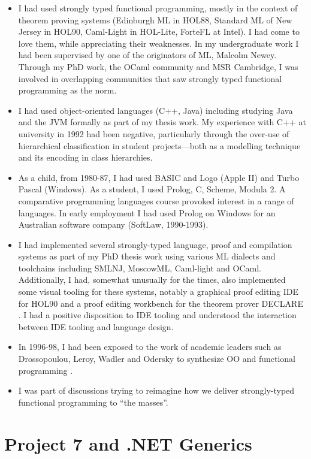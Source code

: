 \documentclass[acmsmall]{acmart}\settopmatter{}
\begin{document}
\begin{itemize}
\item I had used strongly typed functional programming, mostly in the context of theorem proving systems (Edinburgh ML in HOL88, Standard ML
of New Jersey in HOL90, Caml-Light in HOL-Lite, ForteFL at Intel). I had come to love them, while appreciating their weaknesses. In my undergraduate work
I had been supervised by one of the originators of ML, Malcolm Newey. Through my PhD work, the OCaml community and MSR Cambridge, I was
involved in overlapping communities that saw strongly typed functional programming as the norm.
\item I had used object-oriented languages (C++, Java) including studying Java and the JVM formally as part of my thesis work.  My
experience with C++ at university in 1992 had been negative, particularly through the over-use of hierarchical classification in student
projects---both as a modelling technique and its encoding in class hierarchies.  
\item As a child, from 1980-87, I had used BASIC and Logo (Apple II) and Turbo Pascal (Windows). As a student, I used Prolog, C, Scheme, Modula 2. A
comparative programming languages course provoked interest in a range of languages. In early employment I had used Prolog on Windows for an Australian
software company (SoftLaw, 1990-1993). 
\item I had implemented several strongly-typed language, proof and compilation systems as part of my PhD thesis work using various ML dialects and
toolchains including SMLNJ, MoscowML, Caml-light and OCaml. Additionally, I had, somewhat unusually for the times, also implemented some visual tooling
for these systems, notably a graphical proof editing IDE for HOL90 \citep{Syme1995} and a proof editing workbench for the theorem prover DECLARE \citep{Syme99threetactic}.  I
had a positive disposition to IDE tooling and understood the interaction between IDE tooling and language design.
\item In 1996-98, I had been exposed to the work of academic leaders such as Drossopoulou, Leroy, Wadler and Odersky to synthesize OO and functional
programming \citep{AlvesFoss1999}.
\item I was part of discussions trying to reimagine how we deliver strongly-typed functional programming to “the masses”.
\end{itemize}

\section*{Project 7 and .NET Generics}
\end{document}

